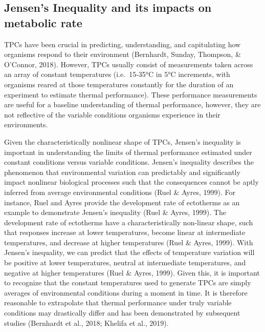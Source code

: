 \documentclass[12pt,twoside]{reedthesis}
\begin{document}
\hypertarget{jensens-inequality-and-its-impacts-on-metabolic-rate}{%
\subsection{Jensen's Inequality and its impacts on metabolic rate}\label{jensens-inequality-and-its-impacts-on-metabolic-rate}}

TPCs have been crucial in predicting, understanding, and capitulating how organisms respond to their environment (Bernhardt, Sunday, Thompson, \& O'Connor, 2018). However, TPCs usually consist of measurements taken across an array of constant temperatures (i.e.~15-35°C in 5°C increments, with organisms reared at those temperatures constantly for the duration of an experiment to estimate thermal performance). These performance measurements are useful for a baseline understanding of thermal performance, however, they are not reflective of the variable conditions organisms experience in their environments.

Given the characteristically nonlinear shape of TPCs, Jensen's inequality is important in understanding the limits of thermal performance estimated under constant conditions versus variable conditions. Jensen's inequality describes the phenomenon that environmental variation can predictably and significantly impact nonlinear biological processes such that the consequences cannot be aptly inferred from average environmental conditions (Ruel \& Ayres, 1999). For instance, Ruel and Ayres provide the development rate of ectotherms as an example to demonstrate Jensen's inequality (Ruel \& Ayres, 1999). The development rate of ectotherms have a characteristically non-linear shape, such that responses increase at lower temperatures, become linear at intermediate temperatures, and decrease at higher temperatures (Ruel \& Ayres, 1999). With Jensen's inequality, we can predict that the effects of temperature variation will be positive at lower temperatures, neutral at intermediate temperatures, and negative at higher temperatures (Ruel \& Ayres, 1999). Given this, it is important to recognize that the constant temperatures used to generate TPCs are simply averages of environmental conditions during a moment in time. It is therefore reasonable to extrapolate that thermal performance under truly variable conditions may drastically differ and has been demonstrated by subsequent studies (Bernhardt et al., 2018; Khelifa et al., 2019).
\end{document}
